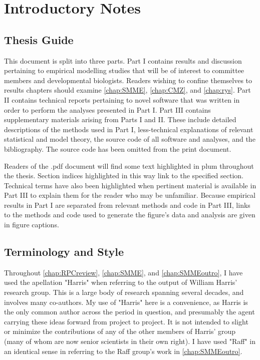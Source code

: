 \section*{Introductory Notes}
\label{ch:intro}

\subsection*{Thesis Guide}
This document is split into three parts. Part I contains results and discussion pertaining to empirical modelling studies that will be of interest to committee members and developmental biologists. Readers wishing to confine themselves to results chapters should examine \autoref{chap:SMME}, \autoref{chap:CMZ}, and \autoref{chap:rys}. Part II contains technical reports pertaining to novel software that was written in order to perform the analyses presented in Part I. Part III contains supplementary materials arising from Parts I and II. These include detailed descriptions of the methods used in Part I, less-technical explanations of relevant statistical and model theory, the source code of all software and analyses, and the bibliography. The source code has been omitted from the print document.

Readers of the .pdf document will find some text highlighted in plum throughout the thesis. Section indices highlighted in this way link to the specified section. Technical terms have also been highlighted when pertinent material is available in Part III to explain them for the reader who may be unfamiliar. Because empirical results in Part I are separated from relevant methods and code in Part III, links to the methods and code used to generate the figure's data and analysis are given in figure captions.

\subsection*{Terminology and Style}
Throughout \autoref{chap:RPCreview}, \autoref{chap:SMME}, and \autoref{chap:SMMEoutro}, I have used the apellation "Harris" when referring to the output of William Harris' research group. This is a large body of research spanning several decades, and involves many co-authors. My use of "Harris" here is a convenience, as Harris is the only common author across the period in question, and presumably the agent carrying these ideas forward from project to project. It is not intended to slight or minimize the contributions of any of the other members of Harris' group (many of whom are now senior scientists in their own right). I have used "Raff" in an identical sense in referring to the Raff group's work in \autoref{chap:SMMEoutro}.

